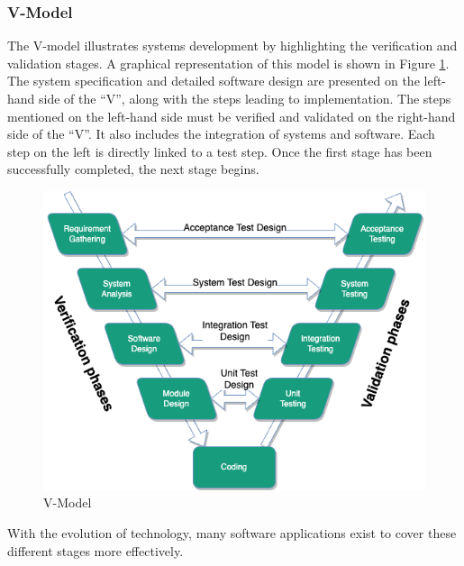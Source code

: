     
\subsubsection{V-Model}
The V-model illustrates systems development by highlighting the verification and validation stages. A graphical representation of this model is shown in Figure \ref{fig:v-model}. The system specification and detailed software design are presented on the left-hand side of the “V”, along with the steps leading to implementation. The steps mentioned on the left-hand side must be verified and validated on the right-hand side of the “V”. It also includes the integration of systems and software. Each step on the left is directly linked to a test step. Once the first stage has been successfully completed, the next stage begins.\\

\begin{figure}[H]
    \centering
    \includegraphics[scale=0.6]{images/V-Model.png}
    \caption{\label{fig:v-model} V-Model }
\end{figure}

With the evolution of technology, many software applications exist to cover these different stages more effectively. 